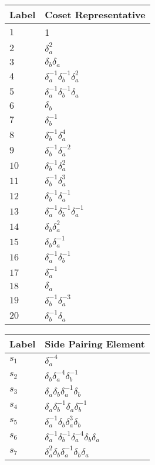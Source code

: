 \documentclass{article}
\begin{document}

\begin{center}
\begin{tabular}{ll}
\toprule
Label & Coset Representative\\
\midrule
$1$ & 1 \\
$2$ & $\delta_a^{2}$ \\
$3$ & $\delta_b^{}\delta_a^{}$ \\
$4$ & $\delta_a^{-1}\delta_b^{-1}\delta_a^{2}$ \\
$5$ & $\delta_a^{-1}\delta_b^{-1}\delta_a^{}$ \\
$6$ & $\delta_b^{}$ \\
$7$ & $\delta_b^{-1}$ \\
$8$ & $\delta_b^{-1}\delta_a^{4}$ \\
$9$ & $\delta_b^{-1}\delta_a^{-2}$ \\
$10$ & $\delta_b^{-1}\delta_a^{2}$ \\
$11$ & $\delta_b^{-1}\delta_a^{3}$ \\
$12$ & $\delta_b^{-1}\delta_a^{-1}$ \\
$13$ & $\delta_a^{-1}\delta_b^{-1}\delta_a^{-1}$ \\
$14$ & $\delta_b^{}\delta_a^{2}$ \\
$15$ & $\delta_b^{}\delta_a^{-1}$ \\
$16$ & $\delta_a^{-1}\delta_b^{-1}$ \\
$17$ & $\delta_a^{-1}$ \\
$18$ & $\delta_a^{}$ \\
$19$ & $\delta_b^{-1}\delta_a^{-3}$ \\
$20$ & $\delta_b^{-1}\delta_a^{}$ \\
\bottomrule
\end{tabular}
\hfill
\begin{tabular}{ll}
\toprule
Label & Side Pairing Element\\
\midrule
$s_{1}$ & $\delta_a^{-4}$ \\
$s_{2}$ & $\delta_b^{}\delta_a^{-4}\delta_b^{-1}$ \\
$s_{3}$ & $\delta_a^{}\delta_b^{}\delta_a^{-1}\delta_b^{}$ \\
$s_{4}$ & $\delta_a^{}\delta_b^{-1}\delta_a^{}\delta_b^{-1}$ \\
$s_{5}$ & $\delta_a^{-1}\delta_b^{}\delta_a^{3}\delta_b^{}$ \\
$s_{6}$ & $\delta_a^{-1}\delta_b^{-1}\delta_a^{-4}\delta_b^{}\delta_a^{}$ \\
$s_{7}$ & $\delta_a^{2}\delta_b^{}\delta_a^{-1}\delta_b^{}\delta_a^{}$ \\

\end{tabular}
\end{center}
\end{document}

